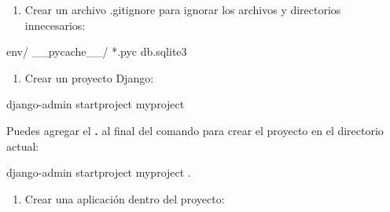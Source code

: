 \documentclass[
  a4paper,
  DIV=11,
  numbers=noendperiod,
  onepage,
  openany]{scrreprt}
\newenvironment{Shaded}{\begin{snugshade}}{\end{snugshade}}
\newcommand{\ExtensionTok}[1]{\textcolor[rgb]{0.00,0.23,0.31}{#1}}
\newcommand{\NormalTok}[1]{\textcolor[rgb]{0.00,0.23,0.31}{#1}}
\providecommand{\tightlist}{%
  \setlength{\itemsep}{0pt}\setlength{\parskip}{0pt}}\usepackage{longtable,booktabs,array}
\begin{document}
\begin{enumerate}
\def\labelenumi{\arabic{enumi}.}
\setcounter{enumi}{2}
\tightlist
\item
  Crear un archivo .gitignore para ignorar los archivos y directorios
  innecesarios:
\end{enumerate}

\begin{Shaded}
\begin{Highlighting}[]
\ExtensionTok{env/}
\ExtensionTok{\_\_pycache\_\_/}
\ExtensionTok{*.pyc}
\ExtensionTok{db.sqlite3}
\end{Highlighting}
\end{Shaded}

\begin{enumerate}
\def\labelenumi{\arabic{enumi}.}
\setcounter{enumi}{3}
\tightlist
\item
  Crear un proyecto Django:
\end{enumerate}

\begin{Shaded}
\begin{Highlighting}[]
\ExtensionTok{django{-}admin}\NormalTok{ startproject myproject}
\end{Highlighting}
\end{Shaded}

\begin{tcolorbox}[enhanced jigsaw, left=2mm, arc=.35mm, rightrule=.15mm, opacityback=0, toprule=.15mm, leftrule=.75mm, colback=white, breakable, colframe=quarto-callout-tip-color-frame, bottomrule=.15mm]
\begin{minipage}[t]{5.5mm}
\textcolor{quarto-callout-tip-color}{\faLightbulb}
\end{minipage}%
\begin{minipage}[t]{\textwidth - 5.5mm}

Puedes agregar el \textbf{.} al final del comando para crear el proyecto
en el directorio actual:

\begin{Shaded}
\begin{Highlighting}[]
\ExtensionTok{django{-}admin}\NormalTok{ startproject myproject .}
\end{Highlighting}
\end{Shaded}

\end{minipage}%
\end{tcolorbox}

\begin{enumerate}
\def\labelenumi{\arabic{enumi}.}
\setcounter{enumi}{4}
\tightlist
\item
  Crear una aplicación dentro del proyecto:
\end{enumerate}
\end{document}
